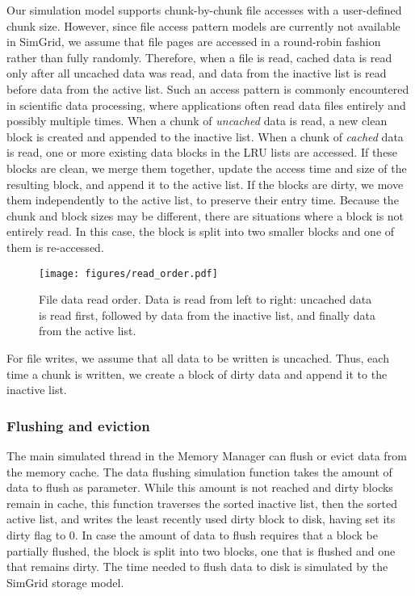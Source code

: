 \documentclass[conference]{IEEEtran}
\begin{document}
    Our simulation model supports chunk-by-chunk file accesses
    with a user-defined chunk size. However, since file access pattern models are currently not available in SimGrid, we assume that file pages are
    accessed in a round-robin fashion rather than fully randomly.
    Therefore, when a file is read, cached data is read only after all uncached data was read, and data from the inactive list is read
    before data from the active list. Such an access pattern is commonly encountered in scientific data processing, where 
    applications often read data files entirely and possibly multiple times. 
    When a chunk of \emph{uncached} data is read, a new clean block is created
    and appended to the inactive list.
    When a chunk of \emph{cached} data is read, one or more existing data blocks in the LRU lists are accessed.
    If these blocks are clean, we merge them together, update the access time and size of the resulting block,
    and append it to the active list.
    If the blocks are dirty, we move them independently to the active list, to preserve their entry time.
    Because the chunk and block sizes may be different, there are situations
    where a block is not entirely read.
    In this case, the block is split into two smaller blocks and one of them is re-accessed.
    \begin{figure}
           \centering
           \texttt{[image: figures/read\_order.pdf]}
           \caption{File data read order. Data is read from left to right: uncached data
           is read first, followed by data from the inactive list, and finally data from the active list. }
           \label{fig:read_order}
    \end{figure}

    For file writes, we assume that all data to be written is
    uncached. Thus, each time a chunk is written, we create a block of dirty data
    and append it to the inactive list.

    \subsubsection{Flushing and eviction}

    The main simulated thread in the Memory Manager can flush or evict data from the
    memory cache. The data flushing simulation
    function takes the amount of data to flush as parameter. While
    this amount is not reached and dirty
    blocks remain in cache, this function traverses the sorted
    inactive list, then the sorted active list, and writes the
    least recently used dirty block to disk, having set its dirty
    flag to 0. In case the amount of data to flush requires that a
    block be partially flushed, the block is split into two blocks,
    one that is flushed and one that remains dirty. The time needed
    to flush data to disk is simulated by the SimGrid storage model.
\end{document}
